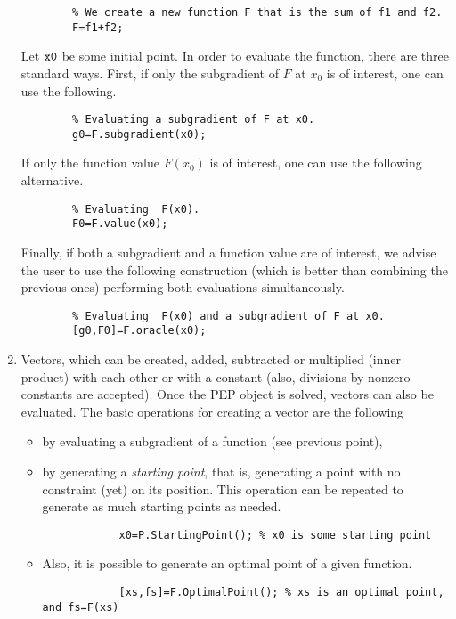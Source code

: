 \documentclass[11pt,a4paper]{article}
\begin{document}
\begin{enumerate}
\begin{lstlisting}
		% We create a new function F that is the sum of f1 and f2.
		F=f1+f2;
		\end{lstlisting}
		Let $\verb?x0?$ be some initial point. In order to evaluate the function, there are three standard ways. First, if only the subgradient of $F$ at $x_0$ is of interest, one can use the following.\\[-1cm]
		\begin{lstlisting}
		% Evaluating a subgradient of F at x0.
		g0=F.subgradient(x0);
		\end{lstlisting} If only the function value $F(x_0)$ is of interest, one can use the following alternative.\\[-1cm]
		\begin{lstlisting}
		% Evaluating  F(x0).
		F0=F.value(x0);
		\end{lstlisting} Finally, if both a subgradient and a function value are of interest, we advise the user to use the following construction (which is better than combining the previous ones) performing both evaluations simultaneously.\\[-1cm]
		\begin{lstlisting}
		% Evaluating  F(x0) and a subgradient of F at x0.
		[g0,F0]=F.oracle(x0);
		\end{lstlisting}
		\item Vectors, which can be created, added, subtracted or multiplied (inner product) with each other or with a constant (also, divisions by nonzero constants are accepted). Once the PEP object is solved, vectors can also be evaluated. The basic operations for creating a vector are the following
		\begin{itemize}
			\item by evaluating a subgradient of a function (see previous point),
			\item by generating a \emph{starting point}, that is, generating a point with no constraint (yet) on its position. This operation can be repeated to generate as much starting points as needed.\\[-1cm]
			\begin{lstlisting}
			x0=P.StartingPoint(); % x0 is some starting point
			\end{lstlisting}
			\item Also, it is possible to generate an optimal point of a given function.\\[-1cm]
			\begin{lstlisting}
			[xs,fs]=F.OptimalPoint(); % xs is an optimal point, and fs=F(xs)
			\end{lstlisting}

\end{itemize}
\end{enumerate}
\end{document}
